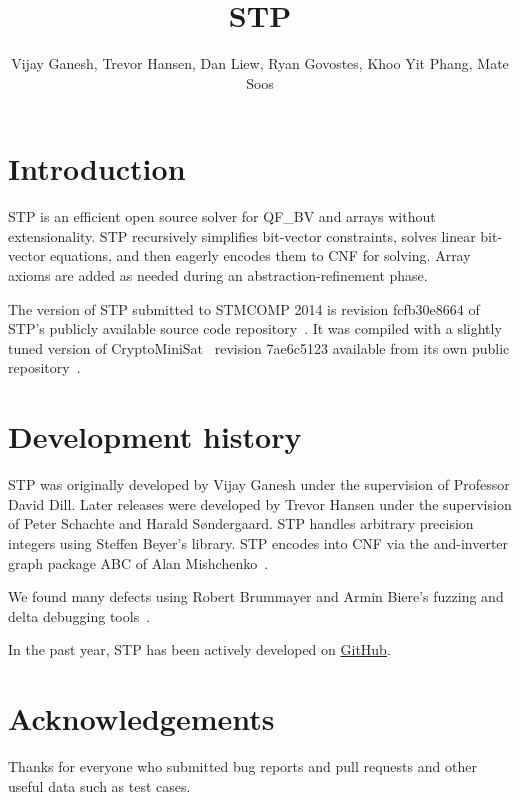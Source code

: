 \documentclass{llncs}
\begin{document}
\title{STP}
\author{Vijay Ganesh, Trevor Hansen, Dan Liew, Ryan Govostes, Khoo Yit Phang, Mate Soos}
\institute{}

\maketitle
\thispagestyle{empty}
\pagestyle{empty}

\section{Introduction}
STP\cite{Vijay:Thesis:2007} is an efficient open source solver for QF\_BV and arrays without extensionality. STP
recursively simplifies bit-vector constraints, solves linear bit-vector equations, and then eagerly encodes them to CNF
for solving. Array axioms are added as needed during an abstraction-refinement phase.

The version of STP submitted to STMCOMP 2014 is revision fcfb30e8664 of STP's publicly available source code
repository~\cite{STP:github}. It was compiled with a slightly tuned version of
CryptoMiniSat~\cite{DBLP:conf/sat/SoosNC09} revision 7ae6c5123 available from its own public
repository~\cite{CMS:github}.


\section{Development history}
STP was originally developed by Vijay Ganesh under the supervision of Professor David Dill. Later releases were
developed by Trevor Hansen under the supervision of Peter Schachte and Harald Søndergaard. STP handles arbitrary
precision integers using Steffen Beyer's library. STP encodes into CNF via the and-inverter graph package ABC of Alan
Mishchenko~\cite{Brayton:2010:AAI:2144310.2144317}.

We found many defects using Robert Brummayer and Armin Biere's
fuzzing and delta debugging tools~\cite{Brummayer:2009:FDS:1670412.1670413}.

In the past year, STP has been actively developed on \href{https://github.com/stp/stp}{GitHub}.

\section*{Acknowledgements}
Thanks for everyone who submitted bug reports and pull requests and other useful data such as test cases.




\vfill
\pagebreak
\end{document}
